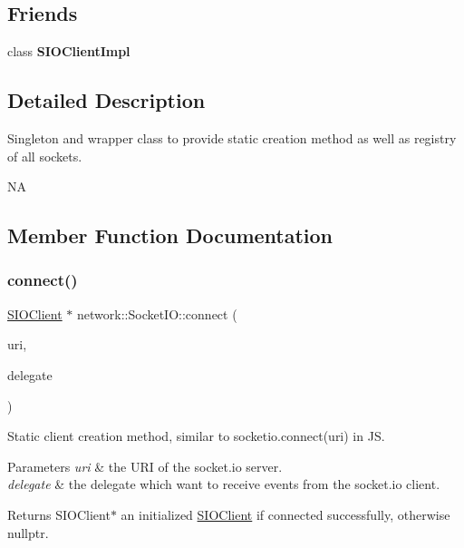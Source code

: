 \subsection*{Friends}
\begin{DoxyCompactItemize}
\item 
\mbox{\label{classnetwork_1_1SocketIO_a377686538a58c24579aedab879d4b9db}} 
class {\bfseries S\+I\+O\+Client\+Impl}
\end{DoxyCompactItemize}


\subsection{Detailed Description}
Singleton and wrapper class to provide static creation method as well as registry of all sockets.

NA 

\subsection{Member Function Documentation}
\mbox{\label{classnetwork_1_1SocketIO_a4a42c0b65a953f0ded8050df6a0854a7}} 
\subsubsection{\texorpdfstring{connect()}{connect()}\hspace{0.1cm}{\footnotesize\ttfamily [1/5]}}
{\footnotesize\ttfamily \hyperlink{classnetwork_1_1SIOClient}{S\+I\+O\+Client} $\ast$ network\+::\+Socket\+I\+O\+::connect (\begin{DoxyParamCaption}\item[{const std\+::string \&}]{uri,  }\item[{\hyperlink{classnetwork_1_1SocketIO_1_1SIODelegate}{Socket\+I\+O\+::\+S\+I\+O\+Delegate} \&}]{delegate }\end{DoxyParamCaption})\hspace{0.3cm}{\ttfamily [static]}}

Static client creation method, similar to socketio.\+connect(uri) in JS. 
\begin{DoxyParams}{Parameters}
{\em uri} & the U\+RI of the socket.\+io server. \\
\hline
{\em delegate} & the delegate which want to receive events from the socket.\+io client. \\
\hline
\end{DoxyParams}
\begin{DoxyReturn}{Returns}
S\+I\+O\+Client$\ast$ an initialized \hyperlink{classnetwork_1_1SIOClient}{S\+I\+O\+Client} if connected successfully, otherwise nullptr. 
\end{DoxyReturn}
\mbox{\label{classnetwork_1_1SocketIO_aefd7c202b26b80f1cf1ecb446851977b}} 
